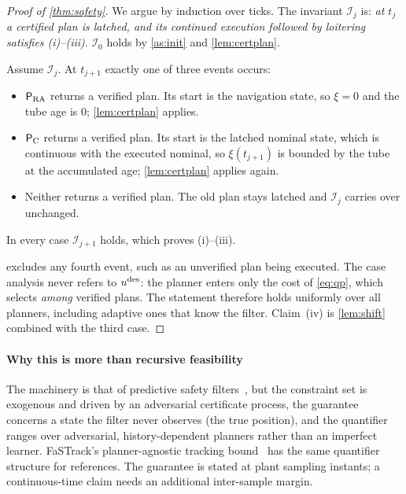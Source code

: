 \begin{proof}[Proof of \cref{thm:safety}]
We argue by induction over ticks. The invariant $\mathcal I_j$ is: \emph{at
$t_j$ a certified plan is latched, and its continued execution followed by
loitering satisfies (i)--(iii)}. $\mathcal I_0$ holds by \cref{as:init} and
\cref{lem:certplan}.

Assume $\mathcal I_j$. At $t_{j+1}$ exactly one of three events occurs:
\begin{itemize}
\item $\mathsf{P}_{\mathrm{RA}}$ returns a verified plan. Its start is the navigation state,
  so $\xi=0$ and the tube age is 0; \cref{lem:certplan} applies.
\item $\mathsf{P}_{\mathrm{C}}$ returns a verified plan. Its start is the latched nominal state,
  which is continuous with the executed nominal, so $\xi(t_{j+1})$ is bounded
  by the tube at the accumulated age; \cref{lem:certplan} applies again.
\item Neither returns a verified plan. The old plan stays latched and
  $\mathcal I_j$ carries over unchanged.
\end{itemize}
In every case $\mathcal I_{j+1}$ holds, which proves (i)--(iii).

 excludes any fourth event, such as an unverified plan
being executed. The case analysis never refers to $u^{\mathrm{des}}$: the planner enters
only the cost of \eqref{eq:qp}, which selects \emph{among} verified plans. The
statement therefore holds uniformly over all planners, including adaptive
ones that know the filter. Claim~(iv) is \cref{lem:shift} combined with the
third case.
\end{proof}

\paragraph{Why this is more than recursive feasibility} The machinery is
that of predictive safety
filters~\cite{wabersich2021psf,wabersich2023datadriven,rawlings2017mpc}, but
the constraint set is exogenous and driven by an adversarial certificate
process, the guarantee concerns a state the filter never observes (the true
position), and the quantifier ranges over adversarial, history-dependent
planners rather than an imperfect learner. FaSTrack's planner-agnostic
tracking bound~\cite{herbert2017fastrack} has the same quantifier structure
for references. The guarantee is stated at plant sampling instants; a
continuous-time claim needs an additional inter-sample margin.

